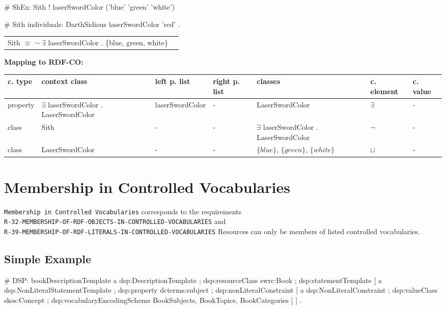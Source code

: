 \documentclass{llncs}
\newcommand{\ms}[1]{\texttt{#1}}
\newenvironment{gcotable}{
  \scriptsize
  \sffamily
  \vspace{0cm}
	\begin{center}
	\textbf{\vspace{0.4cm}Mapping to RDF-CO:} \\
  \begin{tabular}{l|l|l|l|l|l|l}
	\hline
  \textbf{c. type} & \textbf{context class} & \textbf{left p. list} & \textbf{right p. list} & \textbf{classes} & \textbf{c. element} & \textbf{c. value} \\
  \hline

}{
  \hline
  \end{tabular}
	\end{center}
}
\newenvironment{DL}{
  \vspace{0cm}
	\begin{center}
  \begin{tabular}{r l}

}{
  \end{tabular}
	\end{center}
}
\begin{document}
\begin{ex}
# ShEx:
Sith {
    ! laserSwordColor ('blue' 'green' 'white') }
\end{ex}

\begin{ex}
# Sith individuals:
DarthSidious
    laserSwordColor 'red' .
\end{ex}

\begin{DL}
Sith $\equiv$ $\neg$ $\exists$ laserSwordColor . \{blue, green, white\} \\
\end{DL}

\begin{gcotable}
property & $\exists$ laserSwordColor . LaserSwordColor & laserSwordColor & - & LaserSwordColor & $\exists$ & - \\
class & Sith & - & - & $\exists$ laserSwordColor . LaserSwordColor & $\neg$ & - \\
class & LaserSwordColor & - & - & $\{blue\}$, $\{green\}$, $\{white\}$ & $\sqcup$ & - \\
\end{gcotable}

\section{Membership in Controlled Vocabularies}

\ms{Membership in Controlled Vocabularies} corresponds to the requirements \\
\ms{R-32-MEMBERSHIP-OF-RDF-OBJECTS-IN-CONTROLLED-VOCABULARIES} and \\
\ms{R-39-MEMBERSHIP-OF-RDF-LITERALS-IN-CONTROLLED-VOCABULARIES}
Resources can only be members of listed controlled vocabularies.

\subsection{Simple Example}

\begin{ex}
# DSP:
bookDescriptionTemplate 
    a dsp:DescriptionTemplate ;
    dsp:resourceClass swrc:Book ; 
    dsp:statementTemplate [
        a dsp:NonLiteralStatementTemplate ;
        dsp:property dcterms:subject ; 
        dsp:nonLiteralConstraint [ 
            a dsp:NonLiteralConstraint ;
            dsp:valueClass skos:Concept ; 
            dsp:vocabularyEncodingScheme BookSubjects, BookTopics, BookCategories ] ] .
\end{ex}
\end{document}
